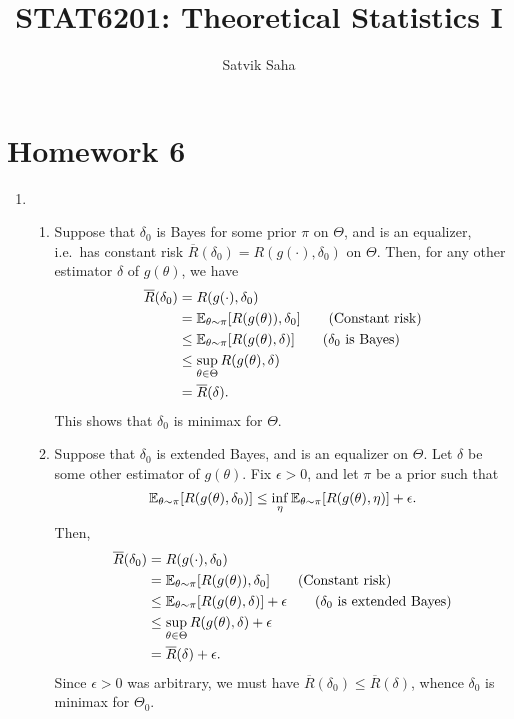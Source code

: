 \documentclass[11pt]{article}
\title{\bfseries STAT6201: Theoretical Statistics I}
\author{Satvik Saha}
\date{}
\begin{document}
    \maketitle

    \section*{Homework 6}

    \begin{enumerate}

        \item
        \begin{enumerate}
            \item Suppose that $\delta_0$ is Bayes for some prior $\pi$ on
            $\Theta$, and is an equalizer, i.e.\ has constant risk
            $\overline{R}(\delta_0) = R(g(\cdot), \delta_0)$ on $\Theta$.
            Then, for any other estimator $\delta$ of $g(\theta)$, we have
            \begin{align*}
                \overline{R}(\delta_0)
                    &= R(g(\cdot), \delta_0) \\
                    &= \mathbb{E}_{\theta \sim \pi}[R(g(\theta)), \delta_0] \tag{Constant risk} \\
                    &\leq \mathbb{E}_{\theta \sim \pi}[R(g(\theta), \delta)] \tag{$\delta_0$ is Bayes} \\
                    &\leq \sup_{\theta \in \Theta} R(g(\theta), \delta) \\
                    &= \overline{R}(\delta).
            \end{align*}
            This shows that $\delta_0$ is minimax for $\Theta$.

            \item Suppose that $\delta_0$ is extended Bayes, and is an
            equalizer on $\Theta$.
            Let $\delta$ be some other estimator of $g(\theta)$.
            Fix $\epsilon > 0$, and let $\pi$ be a prior such that \[
                \mathbb{E}_{\theta \sim \pi}[R(g(\theta), \delta_0)]
                    \leq \inf_\eta \mathbb{E}_{\theta \sim \pi}[R(g(\theta), \eta)] + \epsilon.
            \] Then, \begin{align*}
                \overline{R}(\delta_0)
                    &= R(g(\cdot), \delta_0) \\
                    &= \mathbb{E}_{\theta \sim \pi}[R(g(\theta)), \delta_0] \tag{Constant risk} \\
                    &\leq \mathbb{E}_{\theta \sim \pi}[R(g(\theta), \delta)] + \epsilon \tag{$\delta_0$ is extended Bayes} \\
                    &\leq \sup_{\theta \in \Theta} R(g(\theta), \delta) + \epsilon \\
                    &= \overline{R}(\delta) + \epsilon.
            \end{align*}
            Since $\epsilon > 0$ was arbitrary, we must have
            $\overline{R}(\delta_0) \leq \overline{R}(\delta)$, whence
            $\delta_0$ is minimax for $\Theta_0$.
        \end{enumerate}



\end{enumerate}
\end{document}
